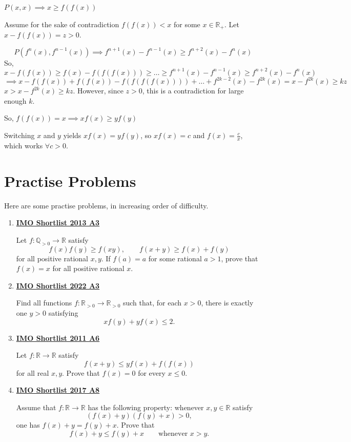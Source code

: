 \documentclass[10pt,letterpaper]{article}
\begin{document}
$P(x,x)\implies x\ge f(f(x))$

Assume for the sake of contradiction $f(f(x))<x$ for some $x\in \mathbb{R_+}$. Let $x-f(f(x))=z>0$.

\[P(f^n(x),f^{n-1}(x))\implies f^{n+1}(x)-f^{n-1}(x)\ge f^{n+2}(x)-f^n(x)\]So, \[x-f(f(x))\ge f(x)-f(f(f(x)))\ge \dots \ge f^{n+1}(x)-f^{n-1}(x)\ge f^{n+2}(x)-f^n(x)\]\[\implies x-f(f(x))+f(f(x))-f(f(f(f(x))))+\dots+f^{2k-2}(x)-f^{2k}(x)=x-f^{2k}(x)\ge kz\]$x>x-f^{2k}(x)\ge kz$. However, since $z>0$, this is a contradiction for large enough $k$.

So, $f(f(x))=x\implies xf(x)\ge yf(y)$

Switching $x$ and $y$ yields $xf(x)=yf(y)$, so $xf(x)=c$ and $f(x)=\frac{c}{x}$, which works $\forall c>0$.
\par{}
\section{Practise Problems}
Here are some practise problems, in increasing order of difficulty.
\begin{enumerate}
\setlength{\itemsep}{12pt}
\item \textbf{\href{https://www.imo-official.org/problems/IMO2013SL.pdf}{IMO Shortlist 2013 A3}}\par
Let $f:\mathbb{Q}_{>0}\to\mathbb{R}$ satisfy
\[f(x)f(y)\ge f(xy),\qquad f(x+y)\ge f(x)+f(y)\]
for all positive rational $x,y$. If $f(a)=a$ for some rational $a>1$, prove that $f(x)=x$ for all positive rational $x$.
\item \textbf{\href{https://www.imo-official.org/problems/IMO2022SL.pdf}{IMO Shortlist 2022 A3}}\par
Find all functions $f:\mathbb{R}_{>0}\to\mathbb{R}_{>0}$ such that, for each $x>0$, there is exactly one $y>0$ satisfying
\[xf(y)+yf(x)\le2.\]
\item \textbf{\href{https://www.imo-official.org/problems/IMO2011SL.pdf}{IMO Shortlist 2011 A6}}\par
Let $f:\mathbb{R}\to\mathbb{R}$ satisfy
\[f(x+y)\le yf(x)+f(f(x))\]
for all real $x,y$. Prove that $f(x)=0$ for every $x\le0$.
\item \textbf{\href{https://www.imo-official.org/problems/IMO2017SL.pdf}{IMO Shortlist 2017 A8}}\par
Assume that $f:\mathbb{R}\to\mathbb{R}$ has the following property: whenever $x,y\in\mathbb{R}$ satisfy
\[(f(x)+y)(f(y)+x)>0,\]
one has $f(x)+y=f(y)+x$. Prove that
\[f(x)+y\le f(y)+x\qquad\text{whenever }x>y.\]
\end{enumerate}
\end{document}
